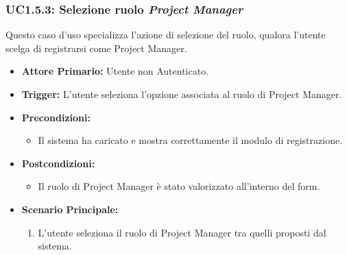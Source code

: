 \documentclass[12pt, a4paper]{article}
\begin{document}
\subsubsection{UC1.5.3: Selezione ruolo \textit{Project Manager}}\label{uc:1.5.3}
Questo caso d'uso specializza l'azione di selezione del ruolo, qualora l'utente scelga di registrarsi come Project Manager.
\begin{itemize}
    \item \textbf{Attore Primario:} Utente non Autenticato.
    \item \textbf{Trigger:} L'utente seleziona l'opzione associata al ruolo di Project Manager.
    \item \textbf{Precondizioni:}\begin{itemize}\item Il sistema ha caricato e mostra correttamente il modulo di registrazione.\end{itemize}
    \item \textbf{Postcondizioni:}\begin{itemize}\item Il ruolo di Project Manager è stato valorizzato all'interno del form.\end{itemize}
    \item \textbf{Scenario Principale:}
    \begin{enumerate}
        \item L'utente seleziona il ruolo di Project Manager tra quelli proposti dal sistema.
    \end{enumerate}
\end{itemize}
\end{document}
